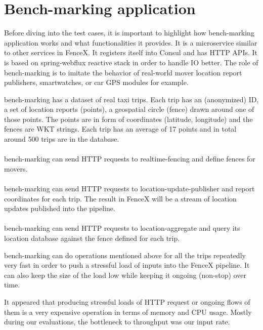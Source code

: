 \documentclass[a4]{report}
\begin{document}
    \section{Bench-marking application}
    Before diving into the test cases, it is important to highlight how bench-marking application works and what
    functionalities it provides.
    It is a microservice similar to other services in FenceX.
    It registers itself into Consul and has HTTP APIs.
    It is based on spring-webflux\cite{webflux} reactive stack in order to handle IO better.
    The role of bench-marking is to imitate the behavior of real-world mover location report publishers,
    smartwatches, or car GPS modules for example.

    bench-marking has a dataset of real taxi trips.
    Each trip has an (anonymized) ID, a set of location reports (points), a geospatial circle (fence) drawn around one of those points.
    The points are in form of coordinates (latitude, longitude) and the fences are WKT strings.
    Each trip has an average of 17 points and in total around 500 trips are in the database.

    \paragraph{}
    bench-marking can send HTTP requests to realtime-fencing and define fences for movers.

    \paragraph{}
    bench-marking can send HTTP requests to location-update-publisher and report coordinates for each trip.
    The result in FenceX will be a stream of location updates published into the pipeline.

    \paragraph{}
    bench-marking can send HTTP requests to location-aggregate and query its location database against the fence
    defined for each trip.

    bench-marking can do operations mentioned above for all the trips repeatedly very fast in order to push a
    stressful load of inputs into the FenceX pipeline.
    It can also keep the size of the load low while keeping it ongoing (non-stop) over time.

    It appeared that producing stressful loads of HTTP request or ongoing flows of them is a very expensive operation
    in terms of memory and CPU usage.
    Mostly during our evaluations, the bottleneck to throughput was our input rate.
\end{document}
